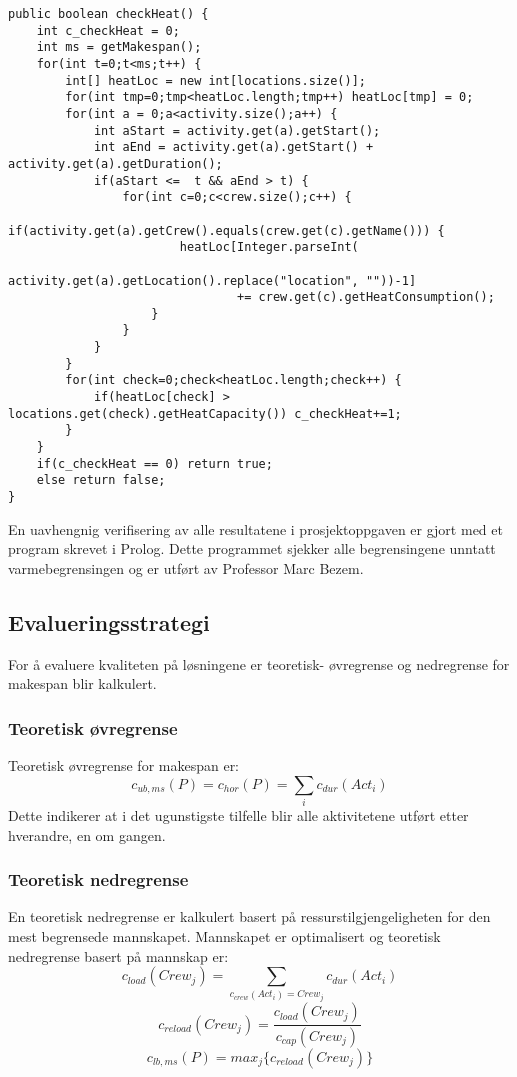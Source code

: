 {\tiny %
\begin{lstlisting}[label=heatChecker,caption=Validering av varmebegrensing]
public boolean checkHeat() {
	int c_checkHeat = 0;
	int ms = getMakespan();
	for(int t=0;t<ms;t++) {
		int[] heatLoc = new int[locations.size()];
		for(int tmp=0;tmp<heatLoc.length;tmp++) heatLoc[tmp] = 0;
		for(int a = 0;a<activity.size();a++) {
			int aStart = activity.get(a).getStart();
			int aEnd = activity.get(a).getStart() + activity.get(a).getDuration();
			if(aStart <=  t && aEnd > t) {
				for(int c=0;c<crew.size();c++) {
					if(activity.get(a).getCrew().equals(crew.get(c).getName())) {
						heatLoc[Integer.parseInt(
							activity.get(a).getLocation().replace("location", ""))-1] 
								+= crew.get(c).getHeatConsumption();
					}
				}
			}
		}
		for(int check=0;check<heatLoc.length;check++) {
			if(heatLoc[check] > locations.get(check).getHeatCapacity()) c_checkHeat+=1;
		}
	}
	if(c_checkHeat == 0) return true;
	else return false;
}
\end{lstlisting}
} %

En uavhengnig verifisering av alle resultatene i prosjektoppgaven er gjort med et program skrevet i Prolog. Dette programmet sjekker alle begrensingene unntatt varmebegrensingen og er utført av Professor Marc Bezem.

\subsection{Evalueringsstrategi}
\label{sec:strategy}
For å evaluere kvaliteten på løsningene er teoretisk- øvregrense og nedregrense for makespan blir kalkulert.

\subsubsection{Teoretisk øvregrense}
\label{sec:teoretiskovre}
Teoretisk øvregrense for makespan er:
\begin{equation}
c_{ub,ms}(P) = c_{hor}(P) = \sum_{i} c_{dur}(Act_{i})
\end{equation}
Dette indikerer at i det ugunstigste tilfelle blir alle aktivitetene utført etter hverandre, en om gangen.

\subsubsection{Teoretisk nedregrense}
\label{sec:teoretisknedre}
En teoretisk nedregrense er kalkulert basert på ressurstilgjengeligheten for den mest begrensede mannskapet. Mannskapet er optimalisert og teoretisk nedregrense basert på mannskap er:
\begin{equation}
c_{load}(Crew_{j}) = \sum_{c_{crew}(Act_{i}) = Crew_{j}} c_{dur}(Act_{i})
\end{equation}
\begin{equation}
c_{reload}(Crew_{j}) = \frac{c_{load}(Crew_{j})}{c_{cap}(Crew_{j})}
\label{eq:mannskapsstyrke}
\end{equation}
\begin{equation}
c_{lb,ms}(P) = max_{j}\{ c_{reload}(Crew_{j}) \}
\end{equation}